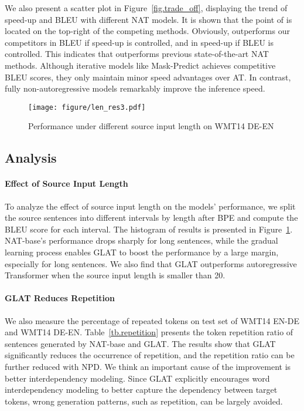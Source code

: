 We also present a scatter plot in Figure~\ref{fig.trade_off}, displaying the trend of speed-up and BLEU with different NAT models.
It is shown that the point of \method is located on the top-right of the competing methods.
Obviously, \method outperforms our competitors in BLEU if speed-up is controlled, and in speed-up if BLEU is controlled.
This indicates that \method outperforms previous state-of-the-art NAT methods.
Although iterative models like Mask-Predict achieves competitive BLEU scores, they only maintain minor speed advantages over AT. In contrast, fully non-autoregressive models remarkably improve the inference speed.

\begin{figure}[!tbp]
\centering
\texttt{[image: figure/len\_res3.pdf]}
\caption{Performance under different source input length on WMT14 DE-EN}
\label{fig.len_res}
\end{figure}
\subsection{Analysis}


\paragraph{Effect of Source Input Length}
To analyze the effect of source input length on the models' performance, we split the source sentences into different intervals by length after BPE and compute the BLEU score for each interval. 
The histogram of results is presented in Figure~\ref{fig.len_res}. 
NAT-base's performance drops sharply for long sentences, while the gradual learning process enables GLAT to boost the performance by a large margin, especially for long sentences. We also find that GLAT outperforms autoregressive Transformer when the source input length is smaller than 20.

\paragraph{GLAT Reduces Repetition}
We also measure the percentage of repeated tokens on test set of WMT14 EN-DE and WMT14 DE-EN. Table~\ref{tb.repetition} presents the token repetition ratio of sentences generated by NAT-base and GLAT.
The results show that GLAT significantly reduces the occurrence of repetition, and the repetition ratio can be further reduced with NPD. We think an important cause of the improvement is better interdependency modeling. Since GLAT explicitly encourages word interdependency modeling to better capture the dependency between target tokens, wrong generation patterns, such as repetition, can be largely avoided.

